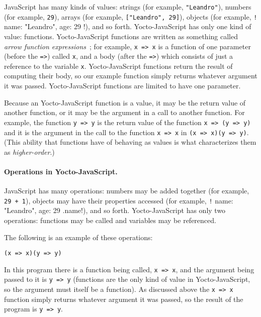 \documentclass[12pt, oneside]{book}
\begin{document}
JavaScript has many kinds of values: strings (for example, \texttt{"Leandro"}), numbers (for example, \texttt{29}), arrays (for example, \texttt{["Leandro", 29]}), objects (for example, \texttt!{ name: "Leandro", age: 29 }!), and so forth. Yocto-JavaScript has only one kind of value: functions. Yocto-JavaScript functions are written as something called \emph{arrow function expressions}~\cite{arrow-function-expressions}; for example, \texttt{x => x} is a function of one parameter (before the \texttt{=>}) called \texttt{x}, and a body (after the \texttt{=>}) which consists of just a reference to the variable \texttt{x}. Yocto-JavaScript functions return the result of computing their body, so our example function simply returns whatever argument it was passed. Yocto-JavaScript functions are limited to have one parameter.

Because an Yocto-JavaScript function is a value, it may be the return value of another function, or it may be the argument in a call to another function. For example, the function \texttt{y => y} is the return value of the function \texttt{x => (y => y)} and it is the argument in the call to the function \texttt{x => x} in \texttt{(x => x)(y => y)}. (This ability that functions have of behaving as values is what characterizes them as \emph{higher-order}.)

\paragraph{Operations in Yocto-JavaScript.}

JavaScript has many operations: numbers may be added together (for example, \texttt{29 + 1}), objects may have their properties accessed (for example, \texttt!{ name: "Leandro", age: 29 }.name!), and so forth. Yocto-JavaScript has only two operations: functions may be called and variables may be referenced.

The following is an example of these operations:

\begin{verbatim}
(x => x)(y => y)
\end{verbatim}

In this program there is a function being called, \texttt{x => x}, and the argument being passed to it is \texttt{y => y} (functions are the only kind of value in Yocto-JavaScript, so the argument must itself be a function). As discussed above the \texttt{x => x} function simply returns whatever argument it was passed, so the result of the program is \texttt{y => y}.
\end{document}
